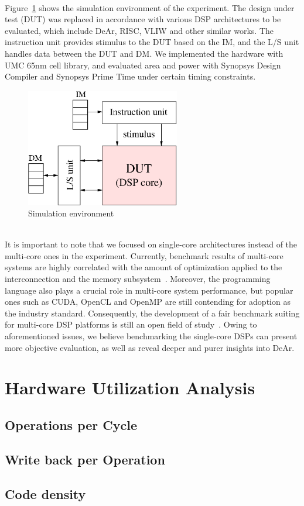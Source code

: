 \\\indent Figure~\ref{fig:sim} shows the simulation environment of the experiment.
The design under test (DUT) was replaced in accordance with various DSP architectures to be evaluated, 
which include DeAr, RISC, VLIW and other similar works.
The instruction unit provides stimulus to the DUT based on the IM,
and the L/S unit handles data between the DUT and DM.
We implemented the hardware with UMC 65nm cell library, 
and evaluated area and power with Synopsys Design Compiler and Synopsys Prime Time under certain timing constraints.
\vspace{\textfig}
\begin{figure}[!ht] 
    \centering
    \includegraphics[width=0.6\textwidth]{./figs/sim.eps}
    \caption{Simulation environment}
    \label{fig:sim}
\end{figure}
\\\indent It is important to note that we focused on single-core architectures instead of the multi-core ones in the experiment.
Currently, benchmark results of multi-core systems are highly correlated with the amount of optimization applied to the interconnection and the memory subsystem~\cite{trends}.
Moreover, the programming language also plays a crucial role in multi-core system performance, 
but popular ones such as CUDA, OpenCL and OpenMP are still contending for adoption as the industry standard.
Consequently, the development of a fair benchmark suiting for multi-core DSP platforms is still an open field of study~\cite{landscape}.
Owing to aforementioned issues, we believe benchmarking the single-core DSPs can present more objective evaluation, 
as well as reveal deeper and purer insights into DeAr.
\section{Hardware Utilization Analysis}
{
    \subsection{Operations per Cycle}
    \subsection{Write back per Operation}
    \subsection{Code density}
}
